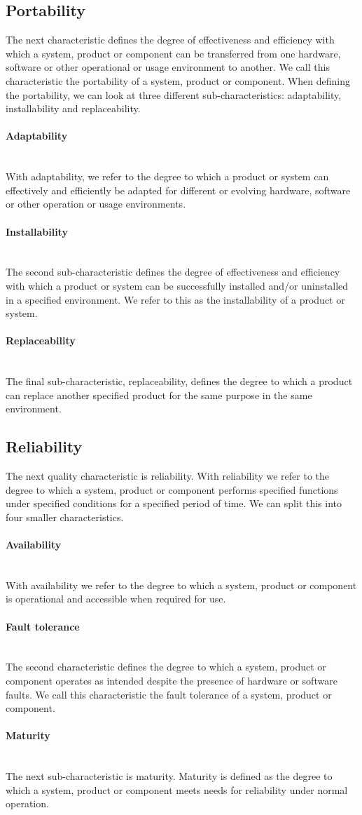 \documentclass[twoside]{uva-inf-bachelor-thesis}
\newcommand{\myparagraph}[1]{\paragraph{#1}\mbox{}\\}
\begin{document}
\subsection{Portability}
The next characteristic defines the degree of effectiveness and efficiency with which a system, product or component can be transferred from one hardware, software or other operational or usage environment to another. We call this characteristic the portability of a system, product or component. When defining the portability, we can look at three different sub-characteristics: adaptability, installability and replaceability.

\myparagraph{Adaptability}
With adaptability, we refer to the degree to which a product or system can effectively and efficiently be adapted for different or evolving hardware, software or other operation or usage environments.

\myparagraph{Installability}
The second sub-characteristic defines the degree of effectiveness and efficiency with which a product or system can be successfully installed and/or uninstalled in a specified environment. We refer to this as the installability of a product or system.

\myparagraph{Replaceability}
The final sub-characteristic, replaceability, defines the degree to which a product can replace another specified product for the same purpose in the same environment.

\subsection{Reliability}
The next quality characteristic is reliability. With reliability we refer to the degree to which a system, product or component performs specified functions under specified conditions for a specified period of time. We can split this into four smaller characteristics.

\myparagraph{Availability}
With availability we refer to the degree to which a system, product or component is operational and accessible when required for use.

\myparagraph{Fault tolerance}
The second characteristic defines the degree to which a system, product or component operates as intended despite the presence of hardware or software faults. We call this characteristic the fault tolerance of a system, product or component.

\myparagraph{Maturity}
The next sub-characteristic is maturity. Maturity is defined as the degree to which a system, product or component meets needs for reliability under normal operation.
\end{document}
